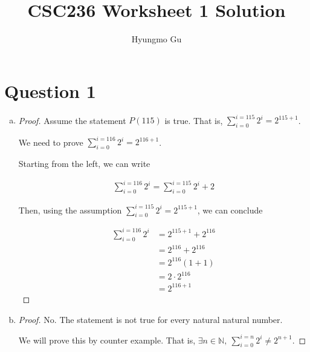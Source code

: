 \documentclass[12pt]{article}
\begin{document}
\title{CSC236 Worksheet 1 Solution}
\author{Hyungmo Gu}
\maketitle

\section*{Question 1}
\begin{enumerate}[a.]
    \item

    \begin{proof}
        Assume the statement $P(115)$ is true. That is, $\sum\limits_{i=0}^{i=115} 2^i = 2^{115+1}$.

        \bigskip

        We need to prove $\sum\limits_{i=0}^{i=116} 2^i = 2^{116+1}$.

        \bigskip

        Starting from the left, we can write

        \bigskip

        \begin{align}
            \sum\limits_{i=0}^{i=116} 2^i = \sum\limits_{i=0}^{i=115} 2^i + 2
        \end{align}

        \bigskip

        Then, using the assumption $\sum\limits_{i=0}^{i=115} 2^i = 2^{115+1}$, we
        can conclude

        \begin{align}
            \sum\limits_{i=0}^{i=116} 2^i &= 2^{115+1} + 2^{116}\\
            &= 2^{116} + 2^{116}\\
            &= 2^{116}(1 + 1)\\
            &= 2 \cdot 2^{116}\\
            &= 2^{116+1}
        \end{align}
    \end{proof}

    \item

    \begin{proof}
        No. The statement is not true for every natural natural number.

        \bigskip

        We will prove this by counter example. That is, $\exists n \in \mathbb{N},\:
        \sum\limits_{i=0}^{i=n} 2^i \neq 2^{n+1}$.


\end{proof}
\end{enumerate}
\end{document}
